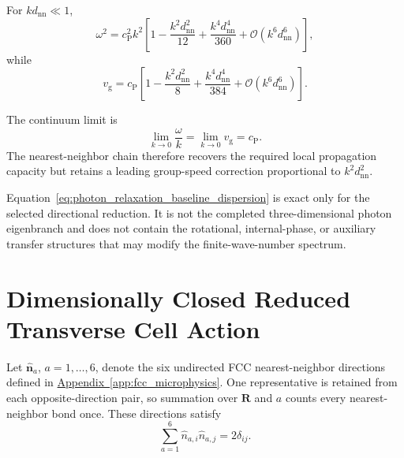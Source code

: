 For \(kd_{\mathrm{nn}}\ll1\),
\begin{equation}
    \omega^2
    =
    c_{\mathrm P}^2k^2
    \left[
        1
        -
        \frac{k^2d_{\mathrm{nn}}^2}{12}
        +
        \frac{k^4d_{\mathrm{nn}}^4}{360}
        +
        \mathcal O
        \left(
            k^6d_{\mathrm{nn}}^6
        \right)
    \right],
    \label{eq:photon_relaxation_baseline_dispersion_expansion}
\end{equation}
while
\begin{equation}
    v_{\mathrm g}
    =
    c_{\mathrm P}
    \left[
        1
        -
        \frac{k^2d_{\mathrm{nn}}^2}{8}
        +
        \frac{k^4d_{\mathrm{nn}}^4}{384}
        +
        \mathcal O
        \left(
            k^6d_{\mathrm{nn}}^6
        \right)
    \right].
    \label{eq:photon_relaxation_baseline_group_velocity_expansion}
\end{equation}

The continuum limit is
\begin{equation}
    \lim_{k\rightarrow0}
    \frac{\omega}{k}
    =
    \lim_{k\rightarrow0}
    v_{\mathrm g}
    =
    c_{\mathrm P}.
    \label{eq:photon_relaxation_baseline_continuum_limit}
\end{equation}
The nearest-neighbor chain therefore recovers the required local propagation
capacity but retains a leading group-speed correction proportional to
\(k^2d_{\mathrm{nn}}^2\).

Equation~\eqref{eq:photon_relaxation_baseline_dispersion} is exact only for
the selected directional reduction. It is not the completed
three-dimensional photon eigenbranch and does not contain the rotational,
internal-phase, or auxiliary transfer structures that may modify the
finite-wave-number spectrum.


\section{Dimensionally Closed Reduced Transverse Cell Action}
\label{sec:photon_relaxation_minimal_closure}

Let \(\widehat{\mathbf n}_a\), \(a=1,\ldots,6\), denote the six undirected FCC
nearest-neighbor directions defined in
\hyperref[app:fcc_microphysics]{Appendix~\ref*{app:fcc_microphysics}}. One
representative is retained from each opposite-direction pair, so summation
over \(\mathbf R\) and \(a\) counts every nearest-neighbor bond once. These
directions satisfy
\begin{equation}
    \sum_{a=1}^{6}
    \widehat n_{a,i}
    \widehat n_{a,j}
    =
    2\delta_{ij}.
    \label{eq:photon_relaxation_fcc_second_moment}
\end{equation}

